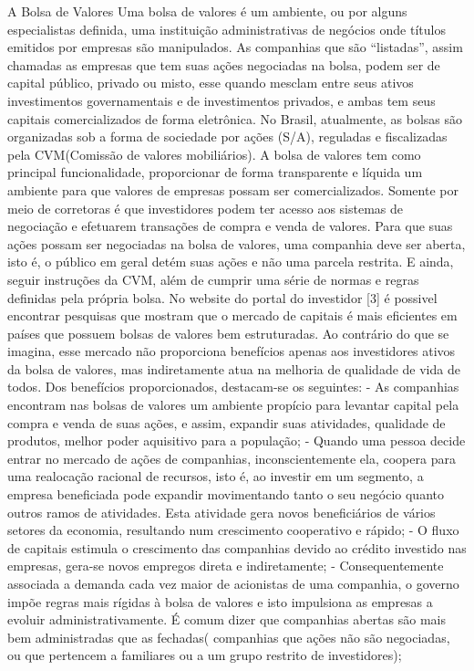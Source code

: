 \documentclass[brazil,twocolumn]{svjour3}
\begin{document}
A Bolsa de Valores
Uma bolsa de valores é um ambiente, ou por alguns especialistas definida, uma instituição administrativas de negócios onde títulos emitidos por empresas são manipulados. As companhias que são “listadas”, assim chamadas as empresas que tem suas ações negociadas na bolsa, podem ser de capital público, privado ou misto, esse quando mesclam entre seus ativos investimentos governamentais e de investimentos privados, e ambas tem seus capitais comercializados de forma eletrônica.
No Brasil, atualmente, as bolsas são organizadas sob a forma de sociedade por ações (S/A), reguladas e fiscalizadas pela CVM(Comissão de valores mobiliários).
A bolsa de valores tem como principal funcionalidade, proporcionar de forma transparente e líquida um ambiente para que valores de empresas possam ser comercializados. Somente por meio de corretoras é que investidores podem ter acesso aos sistemas de negociação e efetuarem transações de compra e venda de valores.
Para que suas ações possam ser negociadas na bolsa de valores, uma companhia deve ser aberta, isto é, o público em geral detém suas ações e não uma parcela restrita. E ainda, seguir instruções da CVM, além de cumprir uma série de normas e regras definidas pela própria bolsa.
No website do portal do investidor [3] é possivel encontrar pesquisas que mostram que o mercado de capitais é mais eficientes em países que possuem bolsas de valores bem estruturadas.
Ao contrário do que se imagina, esse mercado não proporciona benefícios apenas aos investidores ativos da bolsa de valores, mas indiretamente atua na melhoria de qualidade de vida de todos.
Dos benefícios proporcionados, destacam-se os seguintes:
- As companhias encontram nas bolsas de valores um ambiente propício para levantar capital pela compra e venda de suas ações, e assim, expandir suas atividades, qualidade de produtos, melhor poder aquisitivo para a população;
- Quando uma pessoa decide entrar no mercado de ações de companhias, inconscientemente ela, coopera para uma realocação racional de recursos, isto é, ao investir em um segmento, a empresa beneficiada pode expandir movimentando tanto o seu negócio quanto outros ramos de atividades. Esta atividade gera novos beneficiários de vários setores da economia, resultando num crescimento cooperativo e rápido;
- O fluxo de capitais estimula o crescimento das companhias devido ao crédito investido nas empresas, gera-se novos empregos direta e indiretamente;
- Consequentemente associada a demanda cada vez maior de acionistas de uma companhia, o governo impõe regras mais rígidas à bolsa de valores e isto impulsiona as empresas a evoluir administrativamente. É comum dizer que companhias abertas são mais bem administradas que as fechadas( companhias que ações não são negociadas, ou que pertencem a familiares ou a um grupo restrito de investidores);
\end{document}
